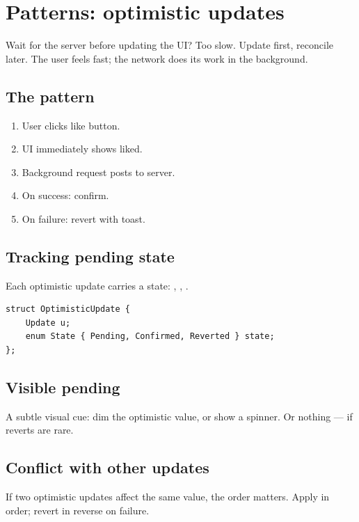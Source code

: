 \chapter{Patterns: optimistic updates}
\label{ch:optimistic}

\begin{aside}
Wait for the server before updating the UI? Too slow. Update
first, reconcile later. The user feels fast; the network does
its work in the background.
\end{aside}

\section{The pattern}

\begin{enumerate}[leftmargin=*]
  \item User clicks like button.
  \item UI immediately shows liked.
  \item Background request posts to server.
  \item On success: confirm.
  \item On failure: revert with toast.
\end{enumerate}

\section{Tracking pending state}

Each optimistic update carries a state: ,
, .

\begin{lstlisting}
struct OptimisticUpdate {
    Update u;
    enum State { Pending, Confirmed, Reverted } state;
};
\end{lstlisting}

\section{Visible pending}

A subtle visual cue: dim the optimistic value, or show a
spinner. Or nothing --- if reverts are rare.

\section{Conflict with other updates}

If two optimistic updates affect the same value, the order
matters. Apply in order; revert in reverse on failure.

